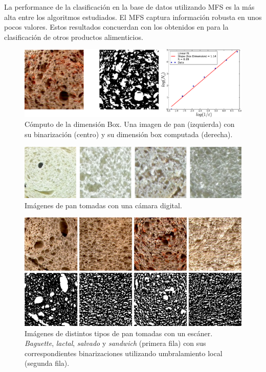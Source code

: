 La performance de la clasificación en la base de datos utilizando MFS es la más alta entre los algoritmos estudiados.
El MFS captura información robusta en unos pocos valores.
Estos resultados concuerdan con los obtenidos en \cite{Bosch2011} para la clasificación de otros productos alimenticios.

\begin{figure}[h!]
\centering
\includegraphics[width=13cm]{dimensionbox}
\caption{Cómputo de la dimensión Box. Una imagen de pan (izquierda) con su binarización (centro) y su dimensión box computada (derecha).}
\label{fig:fitbox}
\end{figure}

\begin{figure}[h!]
\centering
\includegraphics[width=13cm]{pancamara}
\caption{Imágenes de pan tomadas con una cámara digital.}
\label{fig:camera}
\end{figure}

\begin{figure}[h!]
\centering
\includegraphics[width=13cm]{binarizaciones}
\caption{Imágenes de distintos tipos de pan tomadas con un escáner. {\em Baguette}, {\em lactal}, {\em salvado} y {\em sandwich} (primera fila) con sus correspondientes binarizaciones utilizando umbralamiento local (segunda fila).}
\label{fig:bread}
\end{figure}


